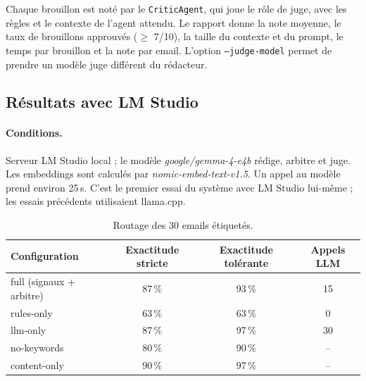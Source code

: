 \documentclass[11pt,a4paper]{article}
\newcommand{\code}[1]{\texttt{#1}}
\begin{document}
Chaque brouillon est noté par le \code{CriticAgent}, qui joue le rôle de juge, avec les
règles et le contexte de l'agent attendu. Le rapport donne la note moyenne, le taux de
brouillons approuvés ($\geq$ 7/10), la taille du contexte et du prompt, le temps par
brouillon et la note par email. L'option \code{--judge-model} permet de prendre un modèle
juge différent du rédacteur.

\subsection{Résultats avec LM Studio}
\label{sec:resultats}

\paragraph{Conditions.} Serveur LM Studio local ; le modèle \emph{google/gemma-4-e4b}
rédige, arbitre et juge. Les embeddings sont calculés par \emph{nomic-embed-text-v1.5}.
Un appel au modèle prend environ 25\,s. C'est le premier essai du système avec LM Studio
lui-même ; les essais précédents utilisaient llama.cpp.

\begin{table}[H]
\centering
\small
\begin{tabularx}{\linewidth}{L c c c}
\toprule
\textbf{Configuration} & \textbf{Exactitude stricte} & \textbf{Exactitude tolérante} & \textbf{Appels LLM} \\
\midrule
full (signaux + arbitre) & 87\,\% & 93\,\% & 15 \\
rules-only & 63\,\% & 63\,\% & 0 \\
llm-only & 87\,\% & 97\,\% & 30 \\
no-keywords & 80\,\% & 90\,\% & -- \\
content-only & 90\,\% & 97\,\% & -- \\
\bottomrule
\end{tabularx}
\caption{Routage des 30 emails étiquetés.}
\label{tab:routage}
\end{table}
\end{document}
